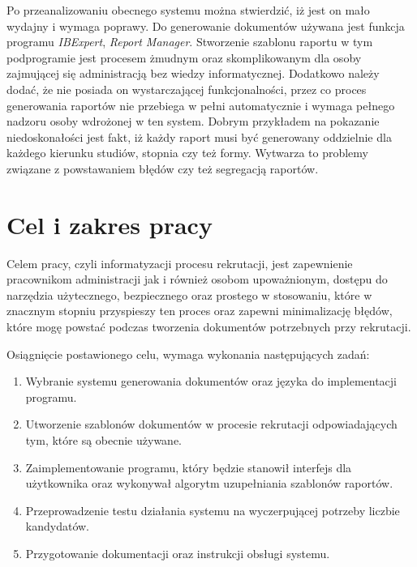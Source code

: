 Po przeanalizowaniu obecnego systemu można stwierdzić, iż jest on mało wydajny i wymaga poprawy. Do generowanie dokumentów używana jest funkcja programu \emph{IBExpert}, \emph{Report Manager}. Stworzenie szablonu raportu w tym podprogramie jest procesem żmudnym oraz skomplikowanym dla osoby zajmującej się administracją bez wiedzy informatycznej. Dodatkowo należy dodać, że nie posiada on wystarczającej funkcjonalności, przez co proces generowania raportów nie przebiega w pełni automatycznie i wymaga pełnego nadzoru osoby wdrożonej w ten system.  Dobrym przykładem na pokazanie niedoskonałości jest fakt, iż każdy raport musi być generowany oddzielnie dla każdego kierunku studiów, stopnia czy też formy. Wytwarza to problemy związane z powstawaniem błędów czy też segregacją raportów.

\section{Cel i zakres pracy}

Celem pracy, czyli informatyzacji procesu rekrutacji, jest zapewnienie pracownikom administracji jak i również osobom upoważnionym, dostępu do narzędzia użytecznego, bezpiecznego oraz prostego w stosowaniu, które w znacznym stopniu przyspieszy ten proces oraz zapewni minimalizację błędów, które mogę powstać podczas tworzenia dokumentów potrzebnych przy rekrutacji. 
\par
Osiągnięcie postawionego celu, wymaga wykonania następujących zadań:
\begin{enumerate}
\item Wybranie systemu generowania dokumentów oraz języka do implementacji programu.
\item Utworzenie szablonów dokumentów w procesie rekrutacji odpowiadających tym, które są obecnie używane.
\item Zaimplementowanie programu, który będzie stanowił interfejs dla użytkownika oraz wykonywał algorytm uzupełniania szablonów raportów.
\item Przeprowadzenie testu działania systemu na wyczerpującej potrzeby liczbie kandydatów.
\item Przygotowanie dokumentacji oraz instrukcji obsługi systemu.
\end{enumerate}
